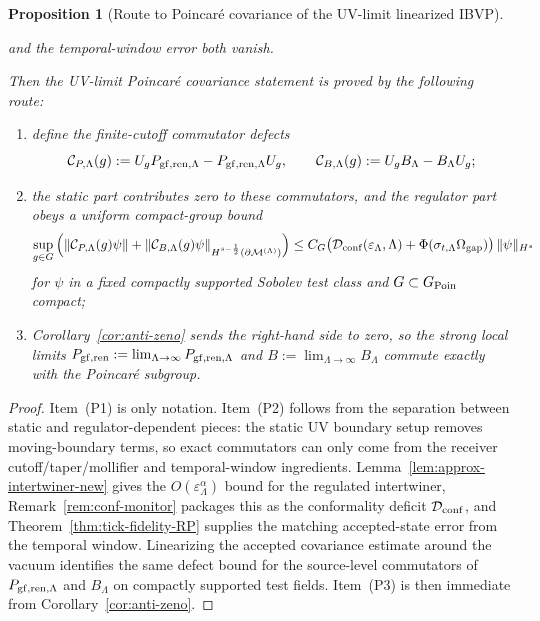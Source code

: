 \documentclass[10pt]{article}
\theoremstyle{definition}
\theoremstyle{plain}
\newtheorem{proposition}{Proposition}[section]
\begin{document}
\begin{proposition}[Route to Poincar\'e covariance of the UV-limit linearized IBVP]
\begin{enumerate}[label=\textnormal{(\roman*)},leftmargin=2.2em,itemsep=1pt]
\)
and the temporal-window error both vanish.
\end{enumerate}
Then the UV-limit Poincar\'e covariance statement is proved by the following route:
\begin{enumerate}[label=\textnormal{(P\arabic*)},leftmargin=2.4em,itemsep=1pt]
\item define the finite-cutoff commutator defects
\[
\mathcal C_{P,\Lambda}(g):=U_gP_{{\rm gf,ren},\Lambda}-P_{{\rm gf,ren},\Lambda}U_g,
\qquad
\mathcal C_{B,\Lambda}(g):=U_gB_\Lambda-B_\Lambda U_g;
\]
\item the static part contributes zero to these commutators, and the regulator part obeys a uniform compact-group bound
\[
\sup_{g\in G}\Big(\|\mathcal C_{P,\Lambda}(g)\psi\|+\|\mathcal C_{B,\Lambda}(g)\psi\|_{H^{s-\frac12}(\partial\mathcal M^{(\Lambda)})}\Big)
\le
C_G\big(\mathcal D_{\rm conf}(\varepsilon_\Lambda,\Lambda)+\Phi(\sigma_{t,\Lambda}\Omega_{\rm gap})\big)\,\|\psi\|_{H^s}
\]
for $\psi$ in a fixed compactly supported Sobolev test class and $G\subset G_{\rm Poin}$ compact;
\item Corollary~\ref{cor:anti-zeno} sends the right-hand side to zero, so the strong local limits
$P_{\rm gf,ren}:=\lim_{\Lambda\to\infty}P_{{\rm gf,ren},\Lambda}$ and $B:=\lim_{\Lambda\to\infty}B_\Lambda$ commute exactly with the Poincar\'e subgroup.
\end{enumerate}
\end{proposition}

\begin{proof}
Item~\textnormal{(P1)} is only notation.  Item~\textnormal{(P2)} follows from the separation between static and regulator-dependent pieces: the static UV
boundary setup removes moving-boundary terms, so exact commutators can only come from the receiver cutoff/taper/mollifier and temporal-window ingredients.
Lemma~\ref{lem:approx-intertwiner-new} gives the $O(\varepsilon_\Lambda^\alpha)$ bound for the regulated intertwiner, Remark~\ref{rem:conf-monitor}
packages this as the conformality deficit $\mathcal D_{\rm conf}$, and Theorem~\ref{thm:tick-fidelity-RP} supplies the matching accepted-state error from
the temporal window.  Linearizing the accepted covariance estimate around the vacuum identifies the same defect bound for the source-level commutators of
$P_{{\rm gf,ren},\Lambda}$ and $B_\Lambda$ on compactly supported test fields.  Item~\textnormal{(P3)} is then immediate from
Corollary~\ref{cor:anti-zeno}.
\end{proof}
\end{document}
